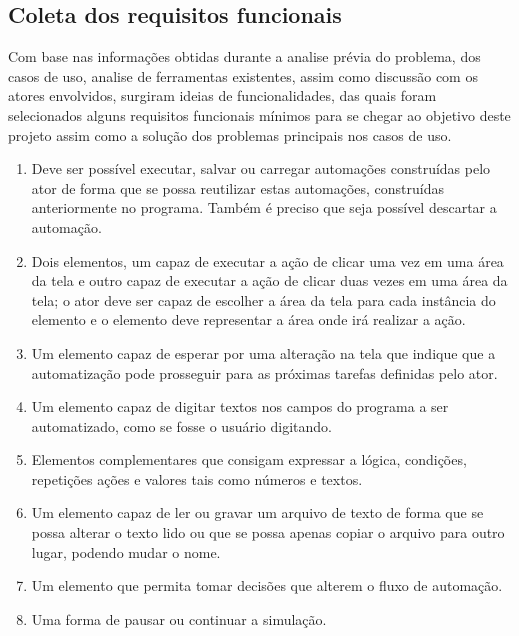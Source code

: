 \documentclass[tg]{mdtufsm}
\begin{document}
            \subsection {Coleta dos requisitos funcionais}

                Com base nas informações obtidas durante a analise prévia do problema, dos casos de uso, analise de ferramentas existentes, assim como discussão com os atores envolvidos, surgiram ideias de funcionalidades, das quais foram selecionados alguns requisitos funcionais mínimos para se chegar ao objetivo deste projeto assim como a solução dos problemas principais nos casos de uso.

                \begin{enumerate}

            		\item Deve ser possível executar, salvar ou carregar automações construídas pelo ator de forma que se possa reutilizar estas automações, construídas anteriormente no programa. Também é preciso que seja possível descartar a automação.

            		\item Dois elementos, um capaz de executar a ação de clicar uma vez em uma área da tela e outro capaz de executar a ação de clicar duas vezes em uma área da tela; o ator deve ser capaz de escolher a área da tela para cada instância do elemento e o elemento deve representar a área onde irá realizar a ação.

            		\item Um elemento capaz de esperar por uma alteração na tela que indique que a automatização pode prosseguir para as próximas tarefas definidas pelo ator.

                   \item Um elemento capaz de digitar textos nos campos do programa a ser automatizado, como se fosse o usuário digitando.

                   \item Elementos complementares que consigam expressar a lógica, condições, repetições ações e valores tais como números e textos.

                   \item Um elemento capaz de ler ou gravar um arquivo de texto de forma que se possa alterar o texto lido ou que se possa apenas copiar o arquivo para outro lugar, podendo mudar o nome.

                   \item Um elemento que permita tomar decisões que alterem o fluxo de automação.

                   \item Uma forma de pausar ou continuar a simulação.

            	\end{enumerate}
\end{document}
